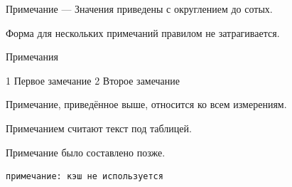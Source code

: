 Примечание — Значения приведены с округлением до сотых.

Форма для нескольких примечаний правилом не затрагивается.

Примечания

1 Первое замечание
2 Второе замечание

Примечание, приведённое выше, относится ко всем измерениям.

Примечанием считают текст под таблицей.

Примечание было составлено позже.

\begin{lstlisting}
примечание: кэш не используется
\end{lstlisting}
